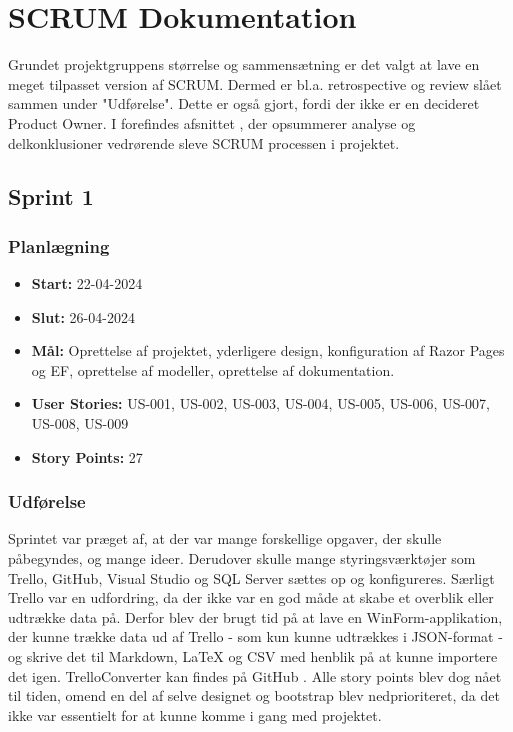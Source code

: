 \chapter{SCRUM Dokumentation}
\label{chapter:scrum-documentation}
Grundet projektgruppens størrelse og sammensætning er det valgt at lave en meget tilpasset version af SCRUM. Dermed er bl.a. retrospective og review slået sammen under "Udførelse". 
Dette er også gjort, fordi der ikke er en decideret Product Owner. 
I  forefindes afsnittet , der opsummerer analyse og delkonklusioner vedrørende sleve SCRUM processen i projektet.

\section{Sprint 1}
\label{sec:sprint-1}
\subsection{Planlægning}
\label{subsec:sprint-1-plan}
\begin{itemize}
    \item \textbf{Start:} 22-04-2024
    \item \textbf{Slut:} 26-04-2024
    \item \textbf{Mål:} Oprettelse af projektet, yderligere design, konfiguration af Razor Pages og EF, oprettelse af modeller, oprettelse af dokumentation.
    \item \textbf{User Stories:} US-001, US-002, US-003, US-004, US-005, US-006, US-007, US-008, US-009
    \item \textbf{Story Points:} 27
\end{itemize}

\subsection{Udførelse}
\label{subsec:sprint-1-udforelse}
Sprintet var præget af, at der var mange forskellige opgaver, der skulle påbegyndes, og mange ideer. 
Derudover skulle mange styringsværktøjer som Trello, GitHub, Visual Studio og SQL Server sættes op og konfigureres. 
Særligt Trello var en udfordring, da der ikke var en god måde at skabe et overblik eller udtrække data på. 
Derfor blev der brugt tid på at lave en WinForm-applikation, der kunne trække data ud af Trello - som kun kunne udtrækkes i JSON-format - og skrive det til Markdown, LaTeX og CSV med henblik på at kunne importere det igen. 
TrelloConverter kan findes på GitHub \cite{trello-converter}. 
Alle story points blev dog nået til tiden, omend en del af selve designet og bootstrap blev nedprioriteret, da det ikke var essentielt for at kunne komme i gang med projektet.


